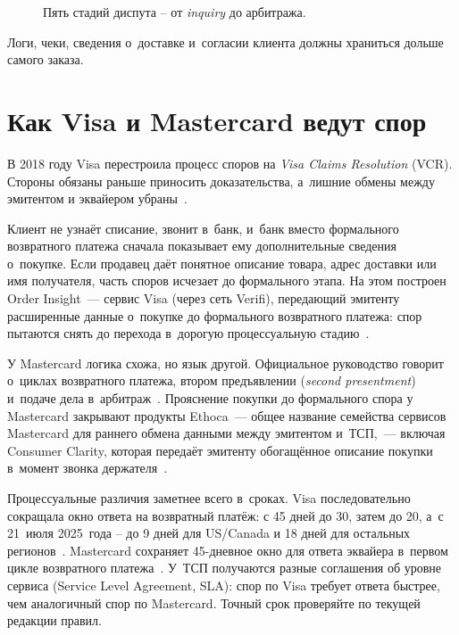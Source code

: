 \begin{figure}[tbp]
  \centering
  \caption{Пять стадий диспута -- от \textit{inquiry} до арбитража.}\label{fig:dispute-lifecycle}
\end{figure}

Логи, чеки, сведения о~доставке и~согласии клиента должны храниться
дольше самого заказа.

\section{Как Visa и Mastercard ведут спор}\label{sec:disputes-vcr-mc}

В 2018 году Visa перестроила процесс споров на \emph{Visa Claims
Resolution} (VCR). Стороны обязаны раньше приносить доказательства,
а~лишние обмены между эмитентом и эквайером убраны~\cite{visa-vcr-merchants,visa-core-rules}.

Клиент не узнаёт
списание, звонит в~банк, и~банк вместо формального возвратного платежа сначала
показывает ему дополнительные сведения о~покупке. Если продавец даёт
понятное описание товара, адрес доставки или имя получателя, часть
споров исчезает до формального этапа. На этом построен Order
Insight~--- сервис Visa (через сеть Verifi), передающий эмитенту
расширенные данные о~покупке до формального возвратного платежа: спор
пытаются снять до перехода в~дорогую процессуальную
стадию~\cite{visa-order-insight}.

У Mastercard логика схожа, но язык другой. Официальное
руководство говорит о~циклах возвратного платежа, втором предъявлении
(\textit{second presentment}) и~подаче
дела в~арбитраж~\cite{mc-chargeback-guide}. Прояснение покупки
до формального спора у Mastercard закрывают продукты Ethoca~--- общее
название семейства сервисов Mastercard для раннего обмена данными
между эмитентом и~ТСП,~--- включая Consumer Clarity, которая передаёт
эмитенту обогащённое описание покупки в~момент звонка
держателя~\cite{mc-dispute-management,mc-ethoca-consumer-clarity}.

Процессуальные различия заметнее всего в~сроках. Visa
последовательно сокращала окно ответа на возвратный платёж: с 45 дней
до 30, затем до 20, а~с 21~июля 2025~года -- до 9 дней для
US/Canada и 18 дней для остальных регионов~\cite{visa-core-rules}.
Mastercard сохраняет 45-дневное окно для ответа эквайера
в~первом цикле возвратного платежа~\cite{mc-chargeback-guide}. У~ТСП
получаются разные соглашения об уровне сервиса (Service Level
Agreement, SLA): спор по Visa требует ответа быстрее, чем аналогичный
спор по Mastercard. Точный срок проверяйте по текущей редакции правил.

